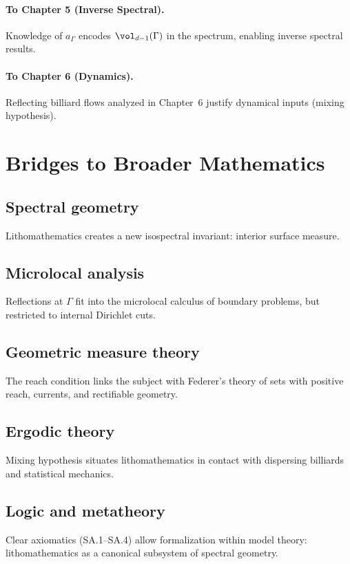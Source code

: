 \paragraph{To Chapter 5 (Inverse Spectral).}
Knowledge of $a_\Gamma$ encodes $\vol_{d-1}(\Gamma)$ in the spectrum, enabling inverse spectral results.

\paragraph{To Chapter 6 (Dynamics).}
Reflecting billiard flows analyzed in Chapter~6 justify dynamical inputs (mixing hypothesis).

\section{Bridges to Broader Mathematics}
\label{sec:bridges}

\subsection{Spectral geometry}
Lithomathematics creates a new isospectral invariant: interior surface measure.

\subsection{Microlocal analysis}
Reflections at $\Gamma$ fit into the microlocal calculus of boundary problems, but restricted to internal Dirichlet cuts.

\subsection{Geometric measure theory}
The reach condition links the subject with Federer’s theory of sets with positive reach, currents, and rectifiable geometry.

\subsection{Ergodic theory}
Mixing hypothesis situates lithomathematics in contact with dispersing billiards and statistical mechanics.

\subsection{Logic and metatheory}
Clear axiomatics (SA.1–SA.4) allow formalization within model theory: lithomathematics as a canonical subsystem of spectral geometry.

